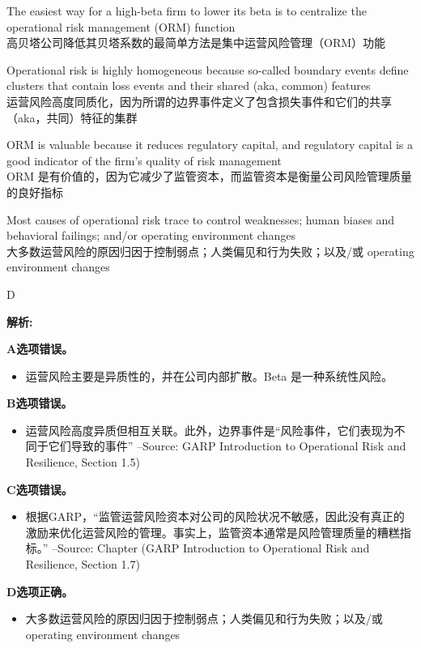 \documentclass{article}
\newenvironment{explanation}
{\textbf{解析:}\par}
{\par}
\begin{document}
  \begin{choices}
      \item The easiest way for a high-beta firm to lower its beta is to centralize the operational risk management (ORM) function\\
      高贝塔公司降低其贝塔系数的最简单方法是集中运营风险管理（ORM）功能
      \item Operational risk is highly homogeneous because so-called boundary events define clusters that contain loss events and their shared (aka, common) features\\
      运营风险高度同质化，因为所谓的边界事件定义了包含损失事件和它们的共享（aka，共同）特征的集群
      \item ORM is valuable because it reduces regulatory capital, and regulatory capital is a good indicator of the firm's quality of risk management\\
      ORM 是有价值的，因为它减少了监管资本，而监管资本是衡量公司风险管理质量的良好指标
      \item Most causes of operational risk trace to control weaknesses; human biases and behavioral failings; and/or operating environment changes\\
      大多数运营风险的原因归因于控制弱点；人类偏见和行为失败；以及/或 operating environment changes
  \end{choices}
  
  \begin{correctanswer}
      D
  \end{correctanswer}
  
  \begin{explanation}

      \textbf{A选项错误。} 
      \begin{itemize}
          \item 运营风险主要是异质性的，并在公司内部扩散。Beta 是一种系统性风险。
      \end{itemize}

      \textbf{B选项错误。} 
      \begin{itemize}
          \item 运营风险高度异质但相互关联。此外，边界事件是“风险事件，它们表现为不同于它们导致的事件” –Source: GARP Introduction to Operational Risk and Resilience, Section 1.5)
      \end{itemize}

      \textbf{C选项错误。} 
      \begin{itemize}
          \item 根据GARP，“监管运营风险资本对公司的风险状况不敏感，因此没有真正的激励来优化运营风险的管理。事实上，监管资本通常是风险管理质量的糟糕指标。” –Source: Chapter (GARP Introduction to Operational Risk and Resilience, Section 1.7)
      \end{itemize}

      \textbf{D选项正确。} 
      \begin{itemize}
          \item 大多数运营风险的原因归因于控制弱点；人类偏见和行为失败；以及/或 operating environment changes
      \end{itemize}
  \end{explanation}
\end{document}
